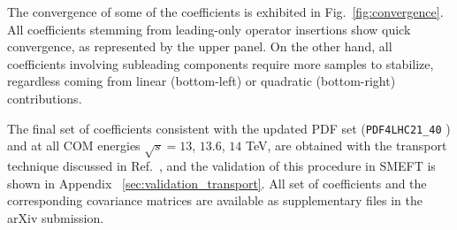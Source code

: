 The convergence of some of the coefficients is exhibited in Fig.~\ref{fig:convergence}. All coefficients stemming from leading-only operator insertions show quick convergence, as represented by the upper panel. On the other hand, all coefficients involving subleading components require more samples to stabilize, regardless coming from linear (bottom-left) or quadratic (bottom-right) contributions.

The final set of coefficients consistent with the updated PDF set (\texttt{PDF4LHC21\_40} \cite{PDF4LHC21}) and at all COM energies $\sqrt{s}=13$,  $13.6$, $14$ TeV, are obtained with the transport technique discussed in Ref.~\cite{ELR_R5}, and the validation of this procedure in SMEFT is shown in Appendix ~\ref{sec:validation_transport}. All set of coefficients and the corresponding covariance matrices are available as supplementary files in the arXiv submission.




